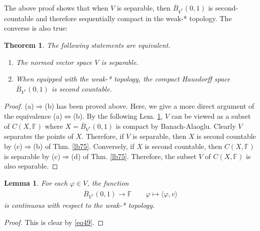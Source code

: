 \documentclass[12pt,b5paper,notitlepage]{article}
\theoremstyle{definition}
\newtheorem{rem}[df]{Remark}
\theoremstyle{plain}
\newtheorem{thm}[df]{Theorem}
\newtheorem{lm}[df]{Lemma}
\newcommand{\ovl}{\overline}
\newcommand{\bk}[1]{\langle {#1}\rangle}
\newcommand{\Zbb}{\mathbb Z}
\newcommand{\Fbb}{\mathbb F}
\numberwithin{equation}{section}
\begin{document}
The above proof shows that when $V$ is separable, then $\ovl B_{V^*}(0,1)$ is second-countable and therefore sequentially compact in the weak-* topology. The converse is also true:

\begin{thm}\label{lb76}
The following statements are equivalent.
\begin{enumerate}[label=(\alph*)]
\item The normed vector space $V$ is separable.
\item When equipped with the weak-* topology, the compact Hausdorff space $\ovl B_{V^*}(0,1)$ is second countable. 
\end{enumerate}
\end{thm}


\begin{proof}
(a)$\Rightarrow$(b) has been proved above. Here, we give a more direct argument of the equivalence (a)$\Leftrightarrow$(b). By the following Lem. \ref{lb74}, $V$ can be viewed as a subset of $C(X,\Fbb)$ where $X=\ovl B_{V^*}(0,1)$ is compact by Banach-Alaoglu. Clearly $V$ separates the points of $X$. Therefore, if $V$ is separable, then $X$ is second countable by (c)$\Rightarrow$(b) of Thm. \ref{lb75}. Conversely, if $X$ is second countable, then $C(X,\Fbb)$ is separable by (c)$\Rightarrow$(d) of Thm. \ref{lb75}. Therefore, the subset $V$ of $C(X,\Fbb)$ is also separable.
\end{proof}

\begin{lm}\label{lb74}
For each $\varphi\in V$, the function
\begin{align*}
\ovl B_{V^*}(0,1)\rightarrow\Fbb\qquad \varphi\mapsto \bk{\varphi,v}
\end{align*}
is continuous with respect to the weak-* topology.
\end{lm}


\begin{proof}
This is clear by \eqref{eq49}.
\end{proof}

\begin{comment}
\begin{rem}
When $V$ is separable, a metric $d$ generating the weak-* topology of $\ovl B_{V^*}(0,1)$ can be explicitly given: Let $(v_n)_{n\in\Zbb_+}$ be a dense sequence in $V$. Replacing $v_n$ with $v_n/\Vert v_n\Vert$ if $v_n\neq 0$, we assume that $\Vert v_n\Vert\leq 1$. Then, by \eqref{eq35}, the metric $d$ can be chosen to be
\begin{align}
d(\varphi_1,\varphi_2)=\sum_{n\in\Zbb_+}2^{-n}|\varphi_1(v_n)-\varphi_2(v_n)|\qquad\text{for each }\varphi_1,\varphi_2\in \ovl B_{V^*}(0,1)
\end{align}
\end{rem}
\end{comment}
\end{document}
